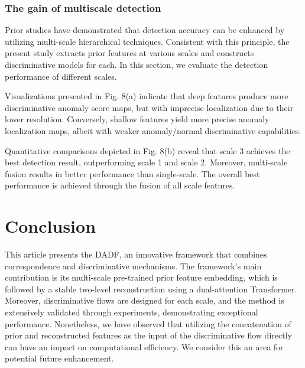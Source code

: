 \documentclass[journal]{IEEEtran}
\begin{document}
\subsubsection{The gain of multiscale detection}

Prior studies\cite{r11} have demonstrated that detection accuracy can be enhanced by utilizing multi-scale hierarchical techniques. Consistent with this principle, the present study extracts prior features at various scales and constructs discriminative models for each. In this section, we evaluate the detection performance of different scales.

Visualizations presented in Fig. 8(a) indicate that deep features produce more discriminative anomaly score maps, but with imprecise localization due to their lower resolution. Conversely, shallow features yield more precise anomaly localization maps, albeit with weaker anomaly/normal discriminative capabilities.

Quantitative comparisons depicted in Fig. 8(b) reveal that scale 3 achieves the best detection result, outperforming scale 1 and scale 2. Moreover, multi-scale fusion results in better performance than single-scale. The overall best performance is achieved through the fusion of all scale features.


\section{Conclusion}
This article presents the DADF, an innovative framework that combines correspondence and discriminative mechanisms. The framework's main contribution is its multi-scale pre-trained prior feature embedding, which is followed by a stable two-level reconstruction using a dual-attention Transformer. Moreover, discriminative flows are designed for each scale, and the method is extensively validated through experiments, demonstrating exceptional performance. Nonetheless, we have observed that utilizing the concatenation of prior and reconstructed features as the input of the discriminative flow directly can have an impact on computational efficiency. We consider this an area for potential future enhancement.





 

\end{document}
